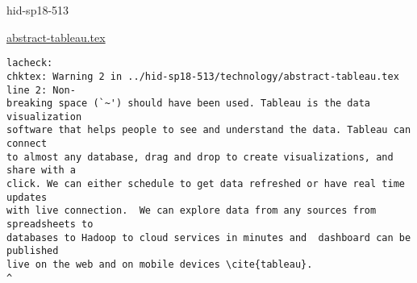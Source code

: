 

\begin{IU}

hid-sp18-513

\href{https://github.com/cloudmesh-community/hid-sp18-513/blob/master//technology/abstract-tableau.tex}{abstract-tableau.tex}

\begin{tiny}
\begin{verbatim}
lacheck: 
chktex: Warning 2 in ../hid-sp18-513/technology/abstract-tableau.tex line 2: Non-
breaking space (`~') should have been used. Tableau is the data visualization
software that helps people to see and understand the data. Tableau can connect
to almost any database, drag and drop to create visualizations, and share with a
click. We can either schedule to get data refreshed or have real time updates
with live connection.  We can explore data from any sources from spreadsheets to
databases to Hadoop to cloud services in minutes and  dashboard can be published
live on the web and on mobile devices \cite{tableau}.
^
\end{verbatim}
\end{tiny}
\end{IU}




